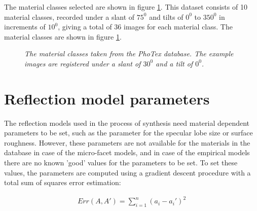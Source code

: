 The material classes selected are shown in figure \ref{fig:PhoTexData2}. This dataset consists of 10 material classes, recorded under a slant of $75^0$ and tilts of $0^0$ to $350^0$ in increments of $10^0$, giving a total of 36 images for each material class. The material classes are shown in figure \ref{fig:PhoTexData2}.

\begin{figure}[h]
	\begin{center}

	\end{center}
	\caption{{\it The material classes taken from the PhoTex database. The example images are registered under a slant of $30^0$ and a tilt of $0^0$.}}
	\label{fig:PhoTexData2}
\end{figure}

\section{Reflection model parameters}\label{sec:ParameterSetting}
The reflection models used in the process of synthesis need material dependent parameters to be set, such as the parameter for the specular lobe size or surface roughness. However, these parameters are not available for the materials in the database in case of the micro-facet models, and in case of the empirical models there are no known 'good' values for the parameters to be set. To set these values, the parameters are computed using a gradient descent procedure with a total sum of squares error estimation:

		\begin{eqnarray*}
			Err(A,A') = \sum_{i=1}^n (a_i - a_i')^2
		\end{eqnarray*}
 
